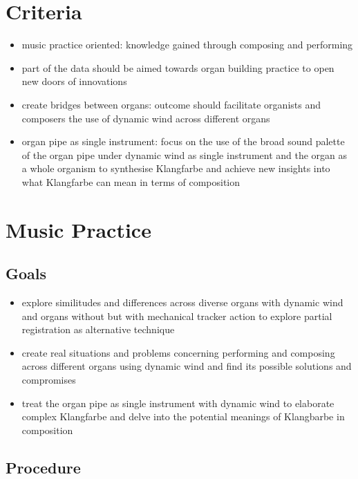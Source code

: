 \section{Criteria}
\begin{itemize}
\item music practice oriented: knowledge gained through composing and performing 
\item part of the data should be aimed towards organ building practice to open new doors of innovations
\item create bridges between organs: outcome should facilitate organists and composers the use of dynamic wind across different organs
\item organ pipe as single instrument: focus on the use of the broad sound palette of the organ pipe under dynamic wind as single instrument and the organ as a whole organism to synthesise Klangfarbe and achieve new insights into what Klangfarbe can mean in terms of composition
\end{itemize}

\section{Music Practice}

\subsection{Goals}

\begin{itemize}
\item explore similitudes and differences across diverse organs with dynamic wind and organs without but with mechanical tracker action to explore partial registration as alternative technique
\item create real situations and problems concerning performing and composing across different organs using dynamic wind and find its possible solutions and compromises
\item treat the organ pipe as single instrument with dynamic wind to elaborate complex Klangfarbe and delve into the potential meanings of Klangbarbe in composition
\end{itemize}

\subsection{Procedure}


